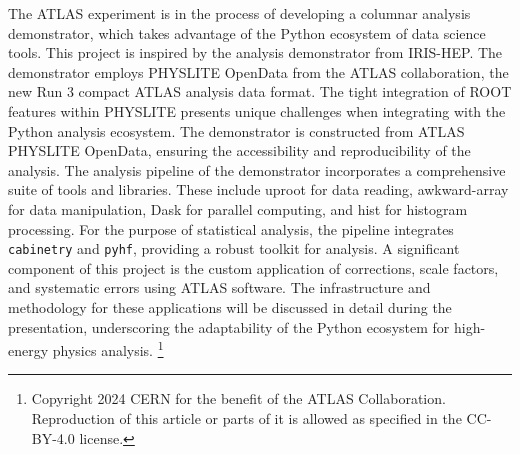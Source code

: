 The ATLAS experiment is in the process of developing a columnar analysis demonstrator, which takes advantage of the Python ecosystem of data science tools.
This project is inspired by the analysis demonstrator from IRIS-HEP.
The demonstrator employs PHYSLITE OpenData from the ATLAS collaboration, the new Run 3 compact ATLAS analysis data format.
The tight integration of ROOT features within PHYSLITE presents unique challenges when integrating with the Python analysis ecosystem.
The demonstrator is constructed from ATLAS PHYSLITE OpenData, ensuring the accessibility and reproducibility of the analysis.
The analysis pipeline of the demonstrator incorporates a comprehensive suite of tools and libraries.
These include uproot for data reading, awkward-array for data manipulation, Dask for parallel computing, and hist for histogram processing.
For the purpose of statistical analysis, the pipeline integrates \texttt{cabinetry} and \texttt{pyhf}, providing a robust toolkit for analysis.
A significant component of this project is the custom application of corrections, scale factors, and systematic errors using ATLAS software.
The infrastructure and methodology for these applications will be discussed in detail during the presentation, underscoring the adaptability of the Python ecosystem for high-energy physics analysis.%
\footnote{
Copyright 2024 CERN for the benefit of the ATLAS Collaboration.
Reproduction of this article or parts of it is allowed as specified in the CC-BY-4.0 license.
}
